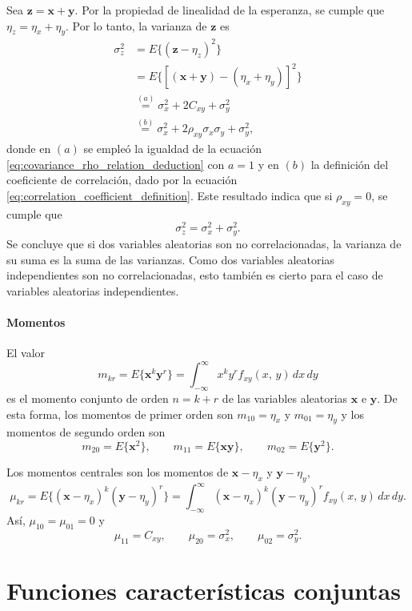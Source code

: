 \documentclass[a4paper]{report}
\newcommand{\x}{\mathbf{x}}
\newcommand{\y}{\mathbf{y}}
\newcommand{\z}{\mathbf{z}}
\begin{document}
Sea \(\z=\x+\y\). Por la propiedad de linealidad de la esperanza, se cumple que \(\eta_z=\eta_x+\eta_y\). Por lo tanto, la varianza de \(\z\) es
\begin{align}\label{eq:sum_of_rv_variance}
 \sigma_z^2&=E\{(\z-\eta_z)^2\}\nonumber\\
   &=E\{\left[(\x+\y)-(\eta_x+\eta_y)\right]^2\}\nonumber\\
   &\overset{(a)}{=}\sigma_x^2+2C_{xy}+\sigma_y^2\nonumber\\
   &\overset{(b)}{=}\sigma_x^2+2\rho_{xy}\sigma_x\sigma_y+\sigma_y^2,
\end{align}
donde en \((a)\) se empleó la igualdad de la ecuación \ref{eq:covariance_rho_relation_deduction} con \(a=1\) y en \((b)\) la definición del coeficiente de correlación, dado por la ecuación \ref{eq:correlation_coefficient_definition}. Este resultado indica que si \(\rho_{xy}=0\), se cumple que
\[
 \sigma_z^2=\sigma_x^2+\sigma_y^2.
\]
Se concluye que si dos variables aleatorias son no correlacionadas, la varianza de su suma es la suma de las varianzas. Como dos variables aleatorias independientes son no correlacionadas, esto también es cierto para el caso de variables aleatorias independientes.

\paragraph{Momentos}

El valor
\[
 m_{kr}=E\{\x^k\y^r\}=\int_{-\infty}^{\infty}x^ky^rf_{xy}(x,\,y)\,dx\,dy
\]
es el momento conjunto de orden \(n=k+r\) de las variables aleatorias \(\x\) e \(\y\). De esta forma, los momentos de primer orden son \(m_{10}=\eta_x\) y \(m_{01}=\eta_y\) y los momentos de segundo orden son
\[
 m_{20}=E\{\x^2\},\qquad m_{11}=E\{\x\y\},\qquad m_{02}=E\{\y^2\}.
\]

Los momentos centrales son los momentos de \(\x-\eta_x\) y \(\y-\eta_y\),
\[
 \mu_{kr}=E\{(\x-\eta_x)^k(\y-\eta_y)^r\}=\int_{-\infty}^{\infty}(\x-\eta_x)^k(\y-\eta_y)^rf_{xy}(x,\,y)\,dx\,dy.
\]
Así, \(\mu_{10}=\mu_{01}=0\) y 
\[
 \mu_{11}=C_{xy},\qquad \mu_{20}=\sigma_x^2,\qquad \mu_{02}=\sigma_y^2.
\]

\section{Funciones características conjuntas}
\end{document}
